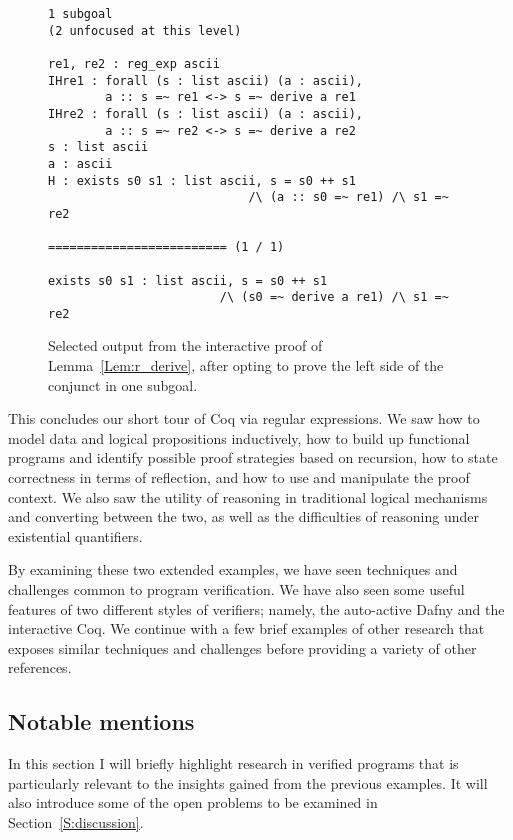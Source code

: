 \begin{figure}
\begin{verbatim}
1 subgoal
(2 unfocused at this level)

re1, re2 : reg_exp ascii
IHre1 : forall (s : list ascii) (a : ascii),
        a :: s =~ re1 <-> s =~ derive a re1
IHre2 : forall (s : list ascii) (a : ascii),
        a :: s =~ re2 <-> s =~ derive a re2
s : list ascii
a : ascii
H : exists s0 s1 : list ascii, s = s0 ++ s1
                            /\ (a :: s0 =~ re1) /\ s1 =~ re2

========================= (1 / 1)

exists s0 s1 : list ascii, s = s0 ++ s1
                        /\ (s0 =~ derive a re1) /\ s1 =~ re2
\end{verbatim}
\caption{Selected output from the interactive proof of Lemma~\ref{Lem:r_derive},
    after opting to prove the left side of the conjunct in one
    subgoal.}\label{F:r_derive2}
\end{figure}

This concludes our short tour of Coq via regular expressions. We saw how to
model data and logical propositions inductively, how to build up functional
programs and identify possible proof strategies based on recursion, how to state
correctness in terms of reflection, and how to use and manipulate the proof
context. We also saw the utility of reasoning in traditional logical mechanisms
and converting between the two, as well as the difficulties of reasoning under
existential quantifiers.

By examining these two extended examples, we have seen techniques and challenges
common to program verification. We have also seen some useful features of two
different styles of verifiers; namely, the auto-active Dafny and the interactive
Coq. We continue with a few brief examples of other research that exposes
similar techniques and challenges before providing a variety of other
references.

\subsection{Notable mentions}\label{S:ex_notable}

In this section I will briefly highlight research in verified programs that is
particularly relevant to the insights gained from the previous examples. It will
also introduce some of the open problems to be examined in
Section~\ref{S:discussion}.

